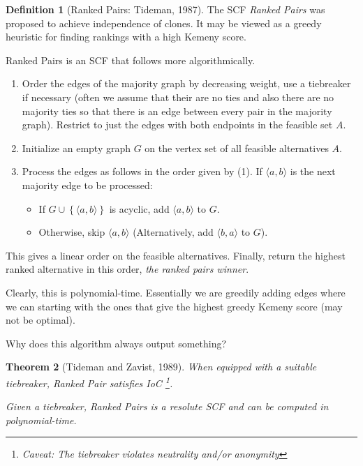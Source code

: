 \documentclass{book}
\newcommand{\unclear}[1]{%
  \par\noindent
  \colorbox{yellow!30}{#1}\par
}
\theoremstyle{plain}
\newtheorem{theorem}{Theorem}[subsection]
\theoremstyle{definition}
\newtheorem{definition}[theorem]{Definition}
\theoremstyle{remark}
\newcommand{\set}[1]{\left\{#1\right\}}
\begin{document}
\begin{definition}[Ranked Pairs: Tideman, 1987]
    The SCF \emph{Ranked Pairs}
    was proposed to achieve independence of clones.
    It may be viewed as a greedy heuristic for finding 
    rankings with a high Kemeny score.

    Ranked Pairs is an SCF that follows more algorithmically.

    \begin{enumerate}
        \item 
        Order the edges of the majority graph by decreasing weight, 
        use a tiebreaker if necessary (often we assume 
        that their are no ties and also there are no majority ties so 
        that there is an edge between every pair in the majority graph).
        Restrict to just the edges with both endpoints in the feasible set $A$.

        \item
        Initialize an empty graph $G$ on the vertex set of all 
        feasible alternatives $A$.

        \item Process the edges as follows in the order given by
        (1). If $\langle a, b \rangle$ is the next majority edge to be processed:
        \begin{itemize}
            \item  If $G \cup \set{\langle a, b \rangle}$ is acyclic, add $\langle a, b \rangle$ to $G$.
            \item Otherwise, skip $\langle a, b \rangle$ (Alternatively, add $\langle b, a \rangle$ to $G$).
        \end{itemize}
    \end{enumerate}
    This gives a linear order on the feasible alternatives.
    Finally, return the highest ranked alternative in this order, 
    \emph{the ranked pairs winner}.

    Clearly, this is polynomial-time.
    Essentially we are greedily adding edges where we can starting with the ones that give the 
    highest greedy Kemeny score (may not be optimal).
\end{definition}
\unclear{Why does this algorithm always output something?}

\begin{theorem}[Tideman and Zavist, 1989]
    When equipped with a suitable tiebreaker, 
    Ranked Pair satisfies 
    IoC
    \footnote{Caveat: The tiebreaker violates neutrality and/or anonymity}.

    Given a tiebreaker, Ranked Pairs is a 
    resolute SCF and can be computed in polynomial-time.
\end{theorem}
\end{document}
